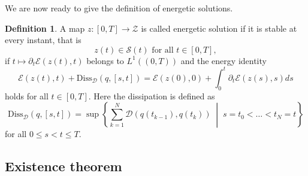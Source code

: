 \documentclass[a4paper,10pt,twoside]{amsbook}
\numberwithin{section}{chapter}
\numberwithin{equation}{chapter}
\theoremstyle{definition}
\newtheorem{defi}[prop]{Definition}
\begin{document}
We are now ready to give the definition of energetic solutions.
\begin{defi}
\label{def:energetic-solution}
A map $z\colon[0,T]\to\mathscr{Z}$ is called energetic solution if it is stable at every instant, that is
\begin{equation}
\text{$z(t)\in\mathscr{S}(t)$ for all $t\in[0,T]$},
\end{equation}
if $t\mapsto\partial_t\mathcal{E}(z(t),t)$ belongs to $L^1((0,T))$ and the energy identity
\[
\mathcal{E}(z(t),t)+\text{Diss}_{\mathcal{D}}(q,[s,t])=\mathcal{E}(z(0),0)+\int_0^t\partial_t\mathcal{E}(z(s),s)ds
\]
holds for all $t\in[0,T]$. Here the dissipation is defined as
\[
\text{Diss}_\mathcal{D}(q,[s,t])=\sup\left\{\sum_{k=1}^N\mathcal{D}(q(t_{k-1}),q(t_k))\;\middle|\;s=t_0<\dots<t_N=t\right\}
\]
for all $0\le s<t\le T$.
\end{defi}

\subsection{Existence theorem}
\end{document}
